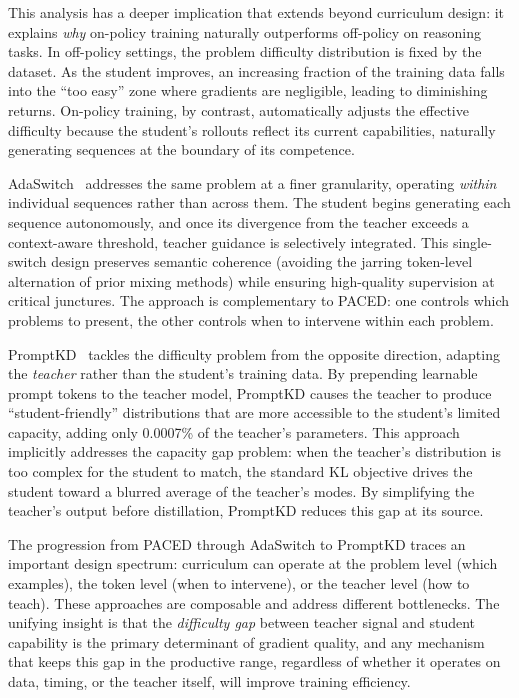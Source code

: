 \documentclass{article} %
\begin{document}
This analysis has a deeper implication that extends beyond curriculum design: it explains \emph{why} on-policy training naturally outperforms off-policy on reasoning tasks. In off-policy settings, the problem difficulty distribution is fixed by the dataset. As the student improves, an increasing fraction of the training data falls into the ``too easy'' zone where gradients are negligible, leading to diminishing returns. On-policy training, by contrast, automatically adjusts the effective difficulty because the student's rollouts reflect its current capabilities, naturally generating sequences at the boundary of its competence.

AdaSwitch~\citep{2510.07842} addresses the same problem at a finer granularity, operating \emph{within} individual sequences rather than across them. The student begins generating each sequence autonomously, and once its divergence from the teacher exceeds a context-aware threshold, teacher guidance is selectively integrated. This single-switch design preserves semantic coherence (avoiding the jarring token-level alternation of prior mixing methods) while ensuring high-quality supervision at critical junctures. The approach is complementary to PACED: one controls which problems to present, the other controls when to intervene within each problem.

PromptKD~\citep{2402.12842} tackles the difficulty problem from the opposite direction, adapting the \emph{teacher} rather than the student's training data. By prepending learnable prompt tokens to the teacher model, PromptKD causes the teacher to produce ``student-friendly'' distributions that are more accessible to the student's limited capacity, adding only 0.0007\% of the teacher's parameters. This approach implicitly addresses the capacity gap problem: when the teacher's distribution is too complex for the student to match, the standard KL objective drives the student toward a blurred average of the teacher's modes. By simplifying the teacher's output before distillation, PromptKD reduces this gap at its source.

The progression from PACED through AdaSwitch to PromptKD traces an important design spectrum: curriculum can operate at the problem level (which examples), the token level (when to intervene), or the teacher level (how to teach). These approaches are composable and address different bottlenecks. The unifying insight is that the \emph{difficulty gap} between teacher signal and student capability is the primary determinant of gradient quality, and any mechanism that keeps this gap in the productive range, regardless of whether it operates on data, timing, or the teacher itself, will improve training efficiency.
\end{document}
